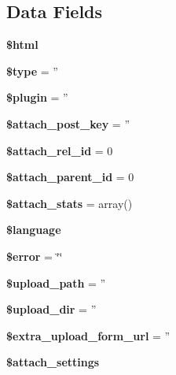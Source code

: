 \subsection*{Data Fields}
\begin{DoxyCompactItemize}
\item 
\hypertarget{classclass__attach_a6f96e7fc92441776c9d1cd3386663b40}{{\bfseries \$html}}\label{classclass__attach_a6f96e7fc92441776c9d1cd3386663b40}

\item 
\hypertarget{classclass__attach_a9a4a6fba2208984cabb3afacadf33919}{{\bfseries \$type} = ''}\label{classclass__attach_a9a4a6fba2208984cabb3afacadf33919}

\item 
\hypertarget{classclass__attach_ada8a7130088351710bb02ed622d6bf65}{{\bfseries \$plugin} = ''}\label{classclass__attach_ada8a7130088351710bb02ed622d6bf65}

\item 
\hypertarget{classclass__attach_a0fc8ed771e9b762e49ef47f6c2d2df28}{{\bfseries \$attach\-\_\-post\-\_\-key} = ''}\label{classclass__attach_a0fc8ed771e9b762e49ef47f6c2d2df28}

\item 
\hypertarget{classclass__attach_a67dbfdddf2d465cc2e70eca89d4a2b62}{{\bfseries \$attach\-\_\-rel\-\_\-id} = 0}\label{classclass__attach_a67dbfdddf2d465cc2e70eca89d4a2b62}

\item 
\hypertarget{classclass__attach_afba9fd2d8a19e2ad7696f8432ce940e9}{{\bfseries \$attach\-\_\-parent\-\_\-id} = 0}\label{classclass__attach_afba9fd2d8a19e2ad7696f8432ce940e9}

\item 
\hypertarget{classclass__attach_aef3529927ab19d95ae42d37c9adc62aa}{{\bfseries \$attach\-\_\-stats} = array()}\label{classclass__attach_aef3529927ab19d95ae42d37c9adc62aa}

\item 
{\bfseries \$language}
\item 
\hypertarget{classclass__attach_aeba2ab722cedda53dbb7ec1a59f45550}{{\bfseries \$error} = \char`\"{}\char`\"{}}\label{classclass__attach_aeba2ab722cedda53dbb7ec1a59f45550}

\item 
\hypertarget{classclass__attach_a38507bf82f955d4b13642a3c7fd6e773}{{\bfseries \$upload\-\_\-path} = ''}\label{classclass__attach_a38507bf82f955d4b13642a3c7fd6e773}

\item 
\hypertarget{classclass__attach_a6dfeab10758bfba126eacc1f4a8a1440}{{\bfseries \$upload\-\_\-dir} = ''}\label{classclass__attach_a6dfeab10758bfba126eacc1f4a8a1440}

\item 
\hypertarget{classclass__attach_a62149d437f5f0732146fa7af2e74974f}{{\bfseries \$extra\-\_\-upload\-\_\-form\-\_\-url} = ''}\label{classclass__attach_a62149d437f5f0732146fa7af2e74974f}

\item 
{\bfseries \$attach\-\_\-settings}
\end{DoxyCompactItemize}

